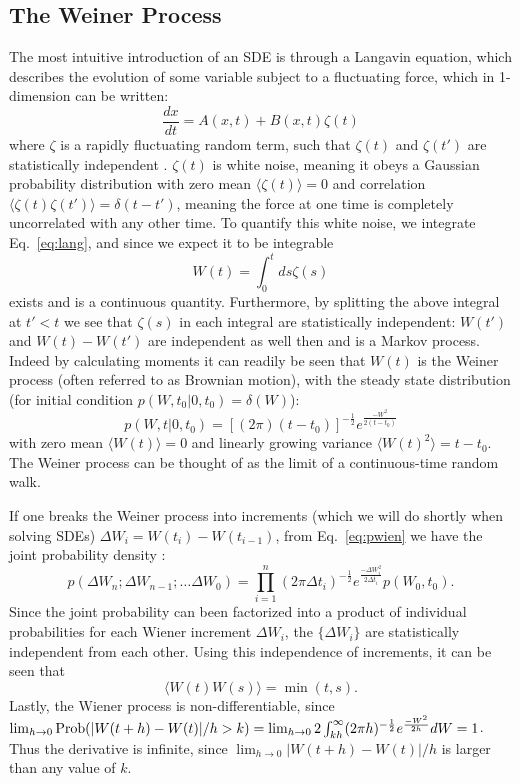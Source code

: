 \documentclass[onecolumn,notitlepage,pra,10pt,aps]{revtex4-1}
\newcommand {\be}{\begin{equation}}
\newcommand {\ee}{\end{equation}}
\newcommand{\expect}[1]{\langle#1\rangle}
\begin{document}
\subsection{The Weiner Process}
\label{subsec:Weiner}

The most intuitive introduction of an SDE is through a Langavin equation, which describes the evolution of some variable subject to a fluctuating force, which in 1-dimension can be written:
\be
\frac{d x}{dt}=A(x, t) +B(x, t)\zeta(t) \label{eq:lang}
\ee
where $\zeta$ is a rapidly fluctuating random term, such that $\zeta(t)$ and $\zeta(t')$ are statistically independent \cite{Gardiner2004}.   $\zeta(t)$ is white noise, meaning it obeys a Gaussian probability distribution with zero mean $\expect{\zeta(t)}=0$ and correlation $\expect{\zeta(t)\zeta(t')}=\delta(t-t')$, meaning the force at one time is completely uncorrelated with any other time.  To quantify this white noise, we integrate Eq.~\eqref{eq:lang}, and since we expect it to be integrable
\be
W(t)=\int_0^t ds \zeta(s)
\ee
exists and is a continuous quantity.  Furthermore, by splitting the above integral at $t'<t$ we see that $\zeta(s)$ in each integral are statistically independent: $W(t')$ and $W(t)-W(t')$ are independent as well then and is a Markov process.  Indeed by calculating moments it can readily be seen that $W(t)$ is the Weiner process (often referred to as Brownian motion), with the steady state distribution  (for initial condition $p(W, t_0| 0, t_0)= \delta(W)$):
\be
p(W, t| 0, t_0)=[(2\pi)(t-t_0)]^{-\frac{1}{2}}e^{\frac{-W^2}{2(t-t_0)}} \label{eq:pwien}
\ee
with zero mean $\expect{{W}(t)}=0$ and  linearly growing variance \cite{Gardiner2004} $\expect{W(t)^2}=t-t_0$. The Weiner process can be thought of as the limit of a continuous-time random walk.


 If one breaks the Weiner process into increments (which we will do shortly when solving SDEs) ${\Delta W_i}=W(t_i)-{W}(t_{i-1})$, from Eq.~\eqref{eq:pwien} we have the joint probability density  \cite{Gardiner2004}:
\be
p({\Delta W_n}; {\Delta W_{n-1}};\dots{\Delta W_0})=\prod_{i=1}^n(2\pi\Delta t_i)^{-\frac{1}{2}}e^{\frac{-{\Delta W}_i^2}{2\Delta t_i}}p(W_0, t_0). \label{eq:probdens}
\ee
  Since the joint probability can been factorized into a product of individual probabilities for each Wiener increment  ${\Delta W_i}$, the $\{ {\Delta W_i}\}$ are statistically independent from each other.  Using this independence of increments, it can be seen that
\be
 \expect{{W}(t){W}(s)}=\min(t, s). \label{eq:Wcov} 
\ee
Lastly, the Wiener process is non-differentiable, since $\lim_{h\to 0} {\rm Prob}(|W(t+h)-W(t)|/h>k)=\lim_{h\to 0} 2\int_{kh}^\infty (2\pi h)^{-\frac{1}{2}}e^{\frac{-W^2}{2h}}dW = 1$.  Thus the derivative is infinite, since $\lim_{h\to 0} |W(t+h)-W(t)|/h$ is larger than any value of $k$.
\end{document}

